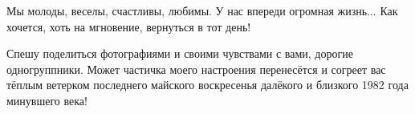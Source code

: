 
Мы молоды, веселы, счастливы, любимы. У нас впереди огромная жизнь... Как
хочется, хоть на мгновение, вернуться в тот день!  

Спешу поделиться фотографиями и своими чувствами с вами, дорогие одногруппники.
Может частичка моего настроения перенесётся и согреет вас тёплым ветерком
последнего майского воскресенья далёкого и близкого 1982 года минувшего века!

